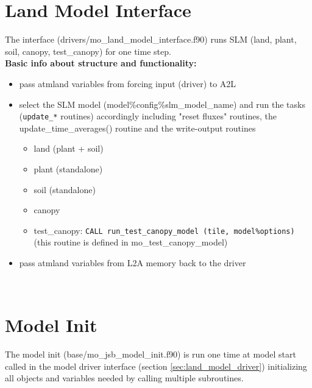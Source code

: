 \newpage
\section{Land Model Interface}\label{sec:land_model_interface}

The interface (drivers/mo{\_}land{\_}model{\_}interface.f90) runs SLM (land, plant, soil, canopy, test{\_}canopy) for one time step.
~\\

\textbf{Basic info about structure and functionality:}
\begin{itemize}
\item pass atmland variables from forcing input (driver) to A2L
\item select the SLM model (model\%config\%slm{\_}model{\_}name) and run the tasks (\texttt{update\_*} routines) accordingly including "reset fluxes" routines, the update\_time\_averages() routine and the write-output routines
\begin{itemize}
\item land (plant + soil)
\item plant (standalone)
\item soil (standalone)
\item canopy
\item test{\_}canopy: \texttt{CALL run\_test\_canopy\_model  (tile, model\%options)} (this routine is defined in mo{\_}test{\_}canopy{\_}model)
\end{itemize}
\item pass atmland variables from L2A memory back to the driver
\end{itemize}
~\\



\newpage
\section{Model Init}\label{sec:model_init}
The model init (base/mo{\_}jsb{\_}model{\_}init.f90) is run one time at model start called in the model driver interface (section \ref{sec:land_model_driver}) initializing all objects and variables needed by calling multiple subroutines.
~\\

